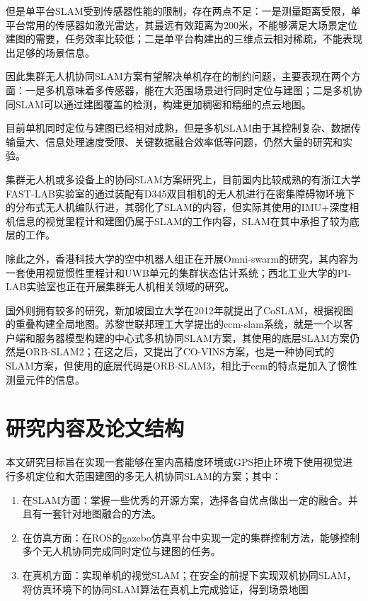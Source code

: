 但是单平台SLAM受到传感器性能的限制，存在两点不足：一是测量距离受限，单平台常用的传感器如激光雷达，其最远有效距离为200米，不能够满足大场景定位建图的需要，任务效率比较低；二是单平台构建出的三维点云相对稀疏，不能表现出足够的场景信息\cite{高家隆2019多无人机协同定位与建图技术研究}。

因此集群无人机协同SLAM方案有望解决单机存在的制约问题，主要表现在两个方面：一是多机意味着多传感器，能在大范围场景进行同时定位与建图；二是多机协同SLAM可以通过建图覆盖的检测，构建更加稠密和精细的点云地图。

目前单机同时定位与建图已经相对成熟，但是多机SLAM由于其控制复杂、数据传输量大、信息处理速度受限、关键数据融合效率低等问题，仍然大量的研究和实验。

集群无人机或多设备上的协同SLAM方案研究上，目前国内比较成熟的有浙江大学FAST-LAB实验室的通过装配有D345双目相机的无人机进行在密集障碍物环境下的分布式无人机编队行进，其弱化了SLAM的内容，但实际其使用的IMU+深度相机信息的视觉里程计和建图仍属于SLAM的工作内容，SLAM在其中承担了较为底层的工作。

除此之外，香港科技大学的空中机器人组正在开展Omni-swarm的研究，其内容为一套使用视觉惯性里程计和UWB单元的集群状态估计系统；西北工业大学的PI-LAB实验室也正在开展集群无人机相关领域的研究。

国外则拥有较多的研究，新加坡国立大学在2012年就提出了CoSLAM，根据视图的重叠构建全局地图\cite{zou2012coslam}。苏黎世联邦理工大学提出的ccm-slam系统，就是一个以客户端和服务器模型构建的中心式多机协同SLAM方案，其使用的底层SLAM方案仍然是ORB-SLAM2\cite{schmuck2019ccm}；在这之后，又提出了CO-VINS方案，也是一种协同式的SLAM方案，但使用的底层代码是ORB-SLAM3\cite{9585827}，相比于ccm的特点是加入了惯性测量元件的信息。

\section{研究内容及论文结构}
本文研究目标旨在实现一套能够在室内高精度环境或GPS拒止环境下使用视觉进行多机定位和大范围建图的多无人机协同SLAM的方案；其中：

\begin{enumerate}
	\item 在SLAM方面：掌握一些优秀的开源方案，选择各自优点做出一定的融合。并且有一套针对地图融合的方法。
	\item 在仿真方面：在ROS的gazebo仿真平台中实现一定的集群控制方法，能够控制多个无人机协同完成同时定位与建图的任务。
	\item 在真机方面：实现单机的视觉SLAM；在安全的前提下实现双机协同SLAM，将仿真环境下的协同SLAM算法在真机上完成验证，得到场景地图
\end{enumerate}

